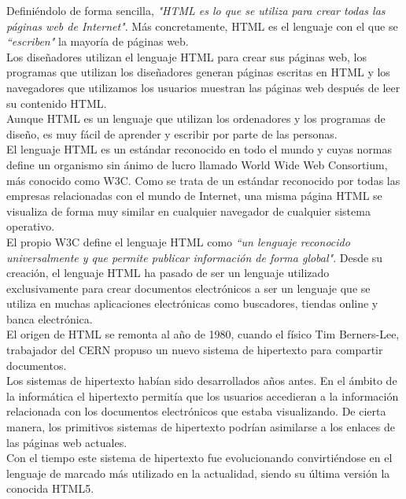 Defini\'endolo de forma sencilla, \textsl{"HTML es lo que se utiliza para crear todas las p\'aginas web de Internet"}. M\'as concretamente, HTML es el lenguaje con el que se \textsl{``escriben"} la mayor\'ia de p\'aginas web.\\

Los dise\~nadores utilizan el lenguaje HTML para crear sus p\'aginas web, los programas que utilizan los dise\~nadores generan p\'aginas escritas en HTML y los navegadores que utilizamos los usuarios muestran las p\'aginas web despu\'es de leer su contenido HTML.\\

Aunque HTML es un lenguaje que utilizan los ordenadores y los programas de dise\~no, es muy f\'acil de aprender y escribir por parte de las personas.\\

El lenguaje HTML es un est\'andar reconocido en todo el mundo y cuyas normas define un organismo sin \'animo de lucro llamado World Wide Web Consortium, m\'as conocido como W3C. Como se trata de un est\'andar reconocido por todas las empresas relacionadas con el mundo de Internet, una misma p\'agina HTML se visualiza de forma muy similar en cualquier navegador de cualquier sistema operativo.\\

El propio W3C define el lenguaje HTML como \textsl{``un lenguaje reconocido universalmente y que permite publicar informaci\'on de forma global"}. Desde su creaci\'on, el lenguaje HTML ha pasado de ser un lenguaje utilizado exclusivamente para crear documentos electr\'onicos a ser un lenguaje que se utiliza en muchas aplicaciones electr\'onicas como buscadores, tiendas online y banca electr\'onica.\\

El origen de HTML se remonta al a\~no de 1980, cuando el f\'isico Tim Berners-Lee, trabajador del CERN propuso un nuevo sistema de hipertexto para compartir documentos.\\

Los sistemas de hipertexto hab\'ian sido desarrollados a\~nos antes. En el \'ambito de la inform\'atica el hipertexto permit\'ia que los usuarios accedieran a la informaci\'on relacionada con los documentos electr\'onicos que estaba visualizando. De cierta manera, los primitivos sistemas de hipertexto podr\'ian asimilarse a los enlaces de las p\'aginas web actuales.\\

Con el tiempo este sistema de hipertexto fue evolucionando convirti\'endose en el lenguaje de marcado m\'as utilizado en la actualidad, siendo su \'ultima versi\'on la conocida HTML5.\\

